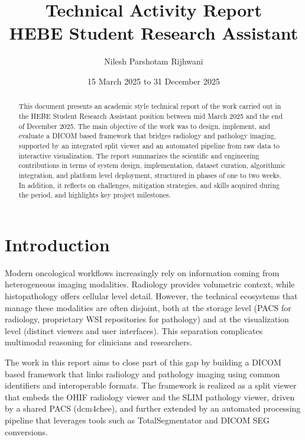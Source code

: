 \documentclass[11pt,a4paper]{article}
\title{Technical Activity Report\\
\large HEBE Student Research Assistant}
\author{Nilesh Parshotam Rijhwani}
\date{15 March 2025 to 31 December 2025}
\begin{document}
\maketitle

\tableofcontents
\newpage

\begin{abstract}
This document presents an academic style technical report of the work carried out in the HEBE Student Research Assistant position between mid March 2025 and the end of December 2025. The main objective of the work was to design, implement, and evaluate a DICOM based framework that bridges radiology and pathology imaging, supported by an integrated split viewer and an automated pipeline from raw data to interactive visualization. The report summarizes the scientific and engineering contributions in terms of system design, implementation, dataset curation, algorithmic integration, and platform level deployment, structured in phases of one to two weeks. In addition, it reflects on challenges, mitigation strategies, and skills acquired during the period, and highlights key project milestones.
\end{abstract}

\section{Introduction}

Modern oncological workflows increasingly rely on information coming from heterogeneous imaging modalities. Radiology provides volumetric context, while histopathology offers cellular level detail. However, the technical ecosystems that manage these modalities are often disjoint, both at the storage level (PACS for radiology, proprietary WSI repositories for pathology) and at the visualization level (distinct viewers and user interfaces). This separation complicates multimodal reasoning for clinicians and researchers.

The work in this report aims to close part of this gap by building a DICOM based framework that links radiology and pathology imaging using common identifiers and interoperable formats. The framework is realized as a split viewer that embeds the OHIF radiology viewer and the SLIM pathology viewer, driven by a shared PACS (dcm4chee), and further extended by an automated processing pipeline that leverages tools such as TotalSegmentator and DICOM SEG conversions.
\end{document}
